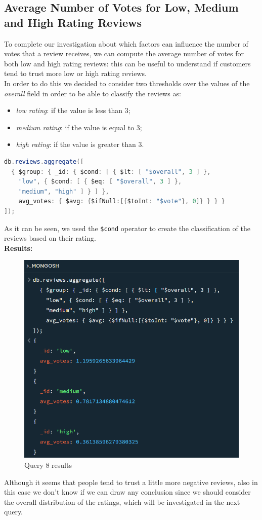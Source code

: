 \newpage
\subsection{Average Number of Votes for Low, Medium and High Rating Reviews}
To complete our investigation about which factors can influence the number of votes that a review receives, we can compute the average number of votes for both low and high rating reviews: this can be useful to understand if customers tend to trust more low or high rating reviews. \\
In order to do this we decided to consider two thresholds over the values of the \textit{overall} field in order to be able to classify the reviews as:
\begin{itemize}
    \item \textit{low rating}: if the value is less than 3;
    \item \textit{medium rating}: if the value is equal to 3;
    \item \textit{high rating}: if the value is greater than 3.
\end{itemize}
\begin{lstlisting}[language=Java]
db.reviews.aggregate([
  { $group: { _id: { $cond: [ { $lt: [ "$overall", 3 ] }, 
    "low", { $cond: [ { $eq: [ "$overall", 3 ] }, 
    "medium", "high" ] } ] }, 
    avg_votes: { $avg: {$ifNull:[{$toInt: "$vote"}, 0]} } } }
]);
\end{lstlisting}
As it can be seen, we used the \texttt{\$cond} operator to create the classification of the reviews based on their rating. \\
\textbf{Results:}
\begin{figure}[H]
  \centering
  \includegraphics[scale=0.55]{Images/q8_result.png}
  \caption{Query 8 results}
  \label{fig:q8_result}
\end{figure}
Although it seems that people tend to trust a little more negative reviews, also in this case we don't know if we can draw any conclusion since we should consider the overall distribution of the ratings, which will be investigated in the next query.

